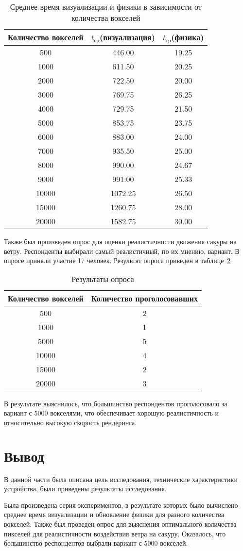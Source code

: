 \begin{table}[H]
	\centering
	\caption{Среднее время визуализации и физики в зависимости от количества вокселей}
	\begin{tabular}{|c|c|c|}
		\hline
		Количество вокселей & $t_{\text{ср}}$(визуализация) & $t_{\text{ср}}$(физика) \\
		\hline
		500  &  446.00  &  19.25  \\
		1000  &  611.50  &  20.25  \\
		2000  &  722.50  &  20.00  \\
		3000  &  769.75  &  26.25  \\
		4000  &  729.75  &  21.50  \\
		5000  &  853.75  &  23.75  \\
		6000  &  883.00  &  24.00  \\
		7000  &  935.50  &  25.00  \\
		8000  &  990.00  &  24.67  \\
		9000  &  991.00  &  25.33  \\
		10000  &  1072.25  &  26.50  \\
		15000  &  1260.75  &  28.00  \\
		20000  &  1582.75  &  30.00  \\
		\hline
	\end{tabular}
	\label{table:voxel_timing}
\end{table}
Также был произведен опрос для оценки реалистичности движения сакуры на ветру. Респонденты выбирали самый реалистичный, по их мнению, вариант. В опросе приняли участие 17 человек. Результат опроса приведен в таблице~\ref{tab:rate}
\begin{table}[H]
	\centering
	\caption{Результаты опроса}
	\begin{tabular}{|c|c|}
		\hline
		\textbf{Количество вокселей} & \textbf{Количество проголосовавших} \\
		\hline
		500 & 2 \\
		\hline
		1000 & 1 \\
		\hline
		5000 & 5 \\
		\hline
		10000 & 4 \\
		\hline
		15000 & 2 \\
		\hline
		20000 & 3 \\
		\hline
	\end{tabular}
	\label{tab:rate}
\end{table}
В результате выяснилось, что большинство респондентов проголосовало за вариант с 5000 вокселями, что обеспечивает хорошую реалистичность и относительно высокую скорость рендеринга.
\section*{Вывод}
В данной части была описана цель исследования, технические характеристики устройства, были приведены результаты исследования.

Была произведена серия экспериментов, в результате которых было вычислено среднее время визуализации и обновление физики для разного количества вокселей. Также был проведен опрос для выяснения оптимального количества пикселей для реалистичности воздействия ветра на сакуру. Оказалось, что большинство респондентов выбрали вариант с 5000 вокселей.

